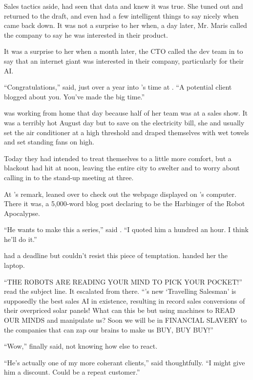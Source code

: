 Sales tactics aside, {\protag} had seen that data and knew it was true. She tuned out and returned to the draft, and even had a few intelligent things to say nicely when \energyJerk{} came back down. It was not a surprise to her when, a day later, Mr. Maris called the company to say he was interested in their product.

It was a surprise to her when a month later, the CTO called the dev team in to say that an internet giant was interested in their company, particularly for their AI.

\sectionBreak{}

``Congratulations,'' {\sidetag} said, just over a year into {\protag}’s time at \energyCompany{}. ``A potential client blogged about you. You've made the big time.''

{\protag} was working from home that day because half of her team was at a sales show. It was a terribly hot August day but to save on the electricity bill, she and {\sidetag} usually set the air conditioner at a high threshold and draped themselves with wet towels and set standing fans on high.

Today they had intended to treat themselves to a little more comfort, but a blackout had hit \crunchyCity{} at noon, leaving the entire city to swelter and {\protag} to worry about calling in to the stand-up meeting at three.

At {\sidetag}'s remark, {\protag} leaned over to check out the webpage displayed on {\sidetag}'s computer. There it was, a 5,000-word blog post declaring \energyCompany{} to be the Harbinger of the Robot Apocalypse.

``He wants to make this a series,'' said {\sidetag}. ``I quoted him a hundred an hour. I think he'll do it.''

{\protag} had a deadline but couldn't resist this piece of temptation. {\sidetag} handed her the laptop.

``THE ROBOTS ARE READING YOUR MIND TO PICK YOUR POCKET!'' read the subject line. It escalated from there. ``\energyCompany{}'s new `Travelling Salesman' is supposedly the best sales AI in existence, resulting in record sales conversions of their overpriced solar panels! What can this be but using machines to READ OUR MINDS and manipulate us? Soon we will be in FINANCIAL SLAVERY to the companies that can zap our brains to make us BUY, BUY BUY!''

``Wow,'' {\protag} finally said, not knowing how else to react.

``He's actually one of my more coherant clients,'' {\sidetag} said thoughtfully. ``I might give him a discount. Could be a repeat customer.''

